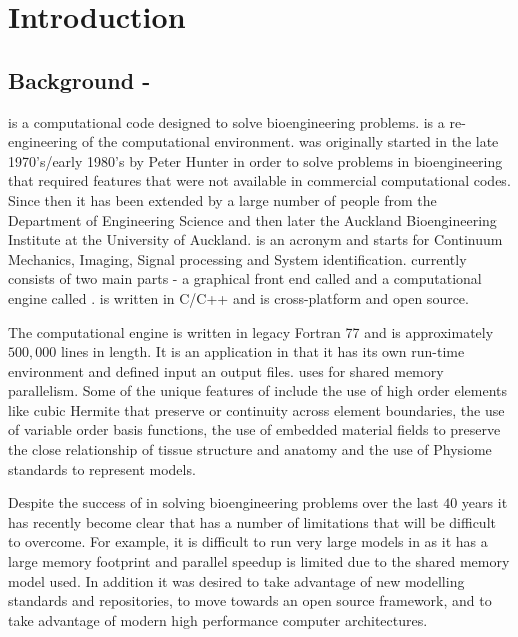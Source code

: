 \chapter{Introduction}
\label{cha:Introduction}

\section{Background - \CMISS}
\label{sec:IntroBackgroundCMISS}

\OpenCMISS is a computational code designed to solve bioengineering
problems. \OpenCMISS is a re-engineering of the \CMISS computational
environment. \CMISS was originally started in the late 1970's/early
1980's by Peter Hunter in order to solve problems in bioengineering
that required features that were not available in commercial
computational codes. Since then it has been extended by a large number
of people from the Department of Engineering Science and then later
the Auckland Bioengineering Institute at the University of
Auckland. \CMISS is an acronym and starts for Continuum Mechanics,
Imaging, Signal processing and System identification. \CMISS currently
consists of two main parts - a graphical front end called \CMGUI and a
computational engine called \CM. \CMGUI is written in C/C++ and is
cross-platform and open source.

The computational engine \CM is written in legacy Fortran 77 and is
approximately $500,000$ lines in length. It is an application in that
it has its own run-time environment and defined input an output
files. \CM uses \OpenMP for shared memory parallelism. Some of the
unique features of \CMISS include the use of high order elements like
cubic Hermite that preserve  or  continuity across
element boundaries, the use of variable order basis functions, the use
of embedded material fields to preserve the close relationship of
tissue structure and anatomy and the use of Physiome standards to
represent models.

Despite the success of \CMISS in solving bioengineering problems over
the last $40$ years it has recently become clear that \CMISS has a
number of limitations that will be difficult to overcome. For example,
it is difficult to run very large models in \CM as it has a large
memory footprint and parallel speedup is limited due to the shared
memory model used. In addition it was desired to take advantage of new
modelling standards and repositories, to move towards an open source
framework, and to take advantage of modern high performance computer
architectures.

